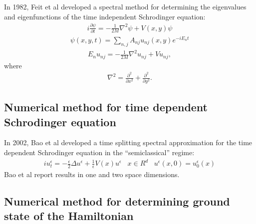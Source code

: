 \documentclass[a4paper,fleqn]{cas-sc}
\begin{document}
In 1982, Feit et al \cite{FEIT1982412} developed a spectral
method for determining the eigenvalues and eigenfunctions of 
the time independent Schrodinger equation:
\begin{eqnarray}
i\frac{\partial\psi}{\partial t}=-\frac{1}{2M}\nabla^{2}\psi+V(x,y)\psi
\end{eqnarray}
\begin{eqnarray}
\psi(x,y,t)=\sum_{n,j}A_{nj}u_{nj}(x,y)e^{-i E_{n}t}
\end{eqnarray}
\begin{eqnarray}
E_{n}u_{nj}=-\frac{1}{2M}\nabla^{2}u_{nj}+Vu_{nj},
\end{eqnarray}
where
\begin{eqnarray}
\nabla^{2}=\frac{\partial^{2}}{\partial x^{2}}+
           \frac{\partial^{2}}{\partial y^{2}}.
\end{eqnarray}

\subsection{Numerical method for time dependent Schrodinger equation}

In 2002, Bao et al \cite{BAO2002487} developed a time splitting
spectral approximation for the time dependent Schrodinger equation
in the ``semiclassical'' regime:
\begin{eqnarray}
iu_{t}^{\epsilon}=-\frac{\epsilon}{2}\Delta u^{\epsilon}+
\frac{1}{\epsilon}V(x)u^{\epsilon} \hspace{10pt} x\in R^{d} \hspace{10pt}
u^{\epsilon}(x,0)=u_{0}^{\epsilon}(x)
\end{eqnarray}
Bao et al report results in one and two space dimensions.

\subsection{Numerical method for determining ground state
of the Hamiltonian}
\end{document}
